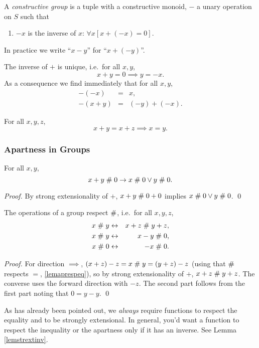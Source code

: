 \begin{definition}\label{defgroup}
  A {\em constructive group\/} is a tuple 
  with  a constructive monoid, $-$ a unary
  operation on $S$ such that 
\begin{enumerate} 
\item $-x$ is the inverse of $x$: $\forall x[x+(-x)=0]$.
\end{enumerate}
In practice we write ``$x-y$'' for ``$x+(-y)$''.
\end{definition}


\begin{lemma}\label{lemuninv}
The inverse of $+$ is unique, i.e.\ for all $x,y$,
$$x + y = 0  \implies y = -x.$$
As a consequence we find immediately that for all $x,y$,
\begin{eqnarray*}
  -(-x) &=& x,\\
  -(x+y) &=& (-y)+(-x).
\end{eqnarray*}
\end{lemma}

\begin{lemma}[Cancellation]\label{lemcanc} For all $x, y, z$,
\[
x+y=x+z \implies x=y.
\]
\end{lemma}

\subsubsection{Apartness in Groups}

\begin{lemma}\label{lemGrpHeyt}
For all $x,y$,
\[ x+y\mathrel{\#} 0 \rightarrow x\mathrel{\#} 0 \vee y\mathrel{\#} 0. \]
\end{lemma}
\begin{proof}
By strong extensionality of $+$,  
$x+y\mathrel{\#} 0+0$ implies $x\mathrel{\#} 0\vee y\mathrel{\#} 0$.
\qed
\end{proof}

\begin{lemma}\label{lemgrstrext}
The operations of a group respect $\mathrel{\#}$, i.e.\ for all $x,y,z$,
\begin{eqnarray*}
x\mathrel{\#} y & \leftrightarrow & x+z \mathrel{\#} y+z,\\
x\mathrel{\#} y & \leftrightarrow & x-y \mathrel{\#} 0,\\
x\mathrel{\#} 0 & \leftrightarrow & -x \mathrel{\#} 0.
\end{eqnarray*}
\end{lemma}
\begin{proof}
For direction $\implies$, $(x+z)-z = x\mathrel{\#} y = (y+z)-z$
(using that $\mathrel{\#}$ respects $=$, \ref{lemaprespeq}), so by strong
extensionality of $+$, $x+z\mathrel{\#} y+z$. The converse uses the forward
direction with $-z$. The second part follows from the first part
noting that $0=y-y$. \qed
\end{proof}

\begin{remark}As has already been pointed out, we {\em always} require 
functions to respect the equality and to be strongly extensional.
In general, you'd want a function to respect the inequality or the
apartness only if it has an inverse. See Lemma \ref{lemstrextinv}.
\end{remark}
